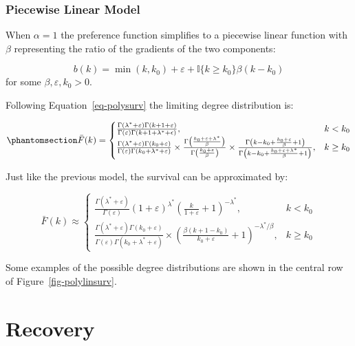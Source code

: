 \documentclass[
  sn-basic,
]{sn-jnl}
\theoremstyle{plain}
\theoremstyle{remark}
\begin{document}
\subsubsection{Piecewise Linear Model}\label{piecewise-linear-model}

When \(\alpha = 1\) the preference function simplifies to a piecewise
linear function with \(\beta\) representing the ratio of the gradients
of the two components:

\[
b(k) = \min(k,k_0) + \varepsilon + \mathbb I\{k\ge k_0\}\beta(k-k_0)
\] for some \(\beta, \varepsilon, k_0>0\).

Following Equation~\ref{eq-polysurv} the limiting degree distribution
is:

\begin{equation}\phantomsection\label{eq-linsurv}{
\bar F(k) = \begin{cases}
\frac{\Gamma(\lambda^*+\varepsilon)\Gamma(k+1+\varepsilon)}{\Gamma(\varepsilon)\Gamma(k+1+\lambda^*+\epsilon)},&k<k_0\\
\frac{\Gamma(\lambda^*+\varepsilon)\Gamma(k_0+\varepsilon)}{\Gamma(\varepsilon)\Gamma(k_0+\lambda^*+\varepsilon)}\times \frac{\Gamma\left(\frac{k_0+\varepsilon+\lambda^*}{\beta}\right)}{\Gamma\left(\frac{k_0+\varepsilon}{\beta}\right)}\times\frac{\Gamma\left(k-k_0 + \frac{k_0+\varepsilon}{\beta}+1\right)}{\Gamma\left(k-k_0 + \frac{k_0+\varepsilon+\lambda^*}{\beta}+1\right)},&k\ge k_0
\end{cases}
}\end{equation}

Just like the previous model, the survival can be approximated by:

\[
\bar F(k) \approx \begin{cases}
\frac{\Gamma(\lambda^*+\varepsilon)}{\Gamma(\varepsilon)} (1+\varepsilon)^{\lambda^*}\left(\frac{k}{1+\varepsilon} + 1\right)^{-\lambda^*},&k<k_0\\
\frac{\Gamma(\lambda^*+\varepsilon)\Gamma(k_0+\varepsilon)}{\Gamma(\varepsilon)\Gamma(k_0+\lambda^*+\varepsilon)}\times\left(\frac{\beta(k+1-k_0)}{k_0+\varepsilon} + 1\right)^{-\lambda^*/\beta},&k\ge k_0
\end{cases}
\]

Some examples of the possible degree distributions are shown in the
central row of Figure~\ref{fig-polylinsurv}.

\section{Recovery}\label{recovery}
\end{document}
